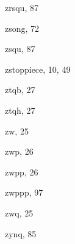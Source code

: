 \begin{theindex}
  \item {\Bslash zrsqu}, 87
  \item {\Bslash zsong}, 72
  \item {\Bslash zsqu}, 87
  \item {\Bslash zstoppiece}, 10, 49
  \item {\Bslash ztqb}, 27
  \item {\Bslash ztqh}, 27
  \item {\Bslash zw}, 25
  \item {\Bslash zwp}, 26
  \item {\Bslash zwpp}, 26
  \item {\Bslash zwppp}, 97
  \item {\Bslash zwq}, 25
  \item {\Bslash zynq}, 85

\end{theindex}
